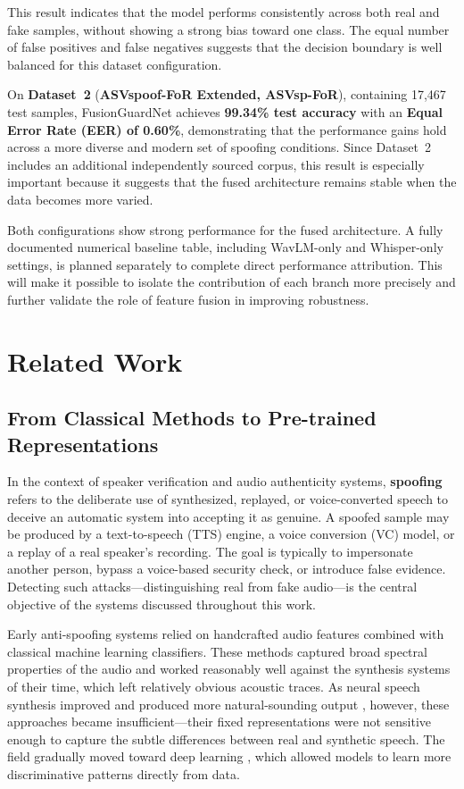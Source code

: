 \documentclass[11pt,a4paper]{article}
\begin{document}
This result indicates that the model performs consistently across both real and
fake samples, without showing a strong bias toward one class. The equal number of
false positives and false negatives suggests that the decision boundary is well
balanced for this dataset configuration.

On \textbf{Dataset~2} (\textbf{ASVspoof-FoR Extended, ASVsp-FoR}), containing
17,467 test samples, FusionGuardNet achieves \textbf{99.34\% test accuracy} with
an \textbf{Equal Error Rate (EER) of 0.60\%}, demonstrating that the performance
gains hold across a more diverse and modern set of spoofing conditions. Since
Dataset~2 includes an additional independently sourced corpus, this result is
especially important because it suggests that the fused architecture remains stable
when the data becomes more varied.

Both configurations show strong performance for the fused architecture. A fully
documented numerical baseline table, including WavLM-only and Whisper-only
settings, is planned separately to complete direct performance attribution. This
will make it possible to isolate the contribution of each branch more precisely
and further validate the role of feature fusion in improving robustness.

\section{Related Work}

\subsection{From Classical Methods to Pre-trained Representations}

In the context of speaker verification and audio authenticity systems,
\textbf{spoofing} refers to the deliberate use of synthesized, replayed, or
voice-converted speech to deceive an automatic system into accepting it as
genuine. A spoofed sample may be produced by a text-to-speech (TTS) engine, a
voice conversion (VC) model, or a replay of a real speaker's recording. The goal
is typically to impersonate another person, bypass a voice-based security check,
or introduce false evidence. Detecting such attacks---distinguishing real from
fake audio---is the central objective of the systems discussed throughout this
work.

Early anti-spoofing systems relied on handcrafted audio features \cite{todisco2017cqcc}
combined with classical machine learning classifiers. These methods captured broad
spectral properties of the audio and worked reasonably well against the synthesis
systems of their time, which left relatively obvious acoustic traces. As neural
speech synthesis improved and produced more natural-sounding output
\cite{li2024survey,li2025where}, however, these approaches became
insufficient---their fixed representations were not sensitive enough to capture
the subtle differences between real and synthetic speech. The field gradually
moved toward deep learning \cite{yi2023survey}, which allowed models to learn more
discriminative patterns directly from data.
\end{document}
